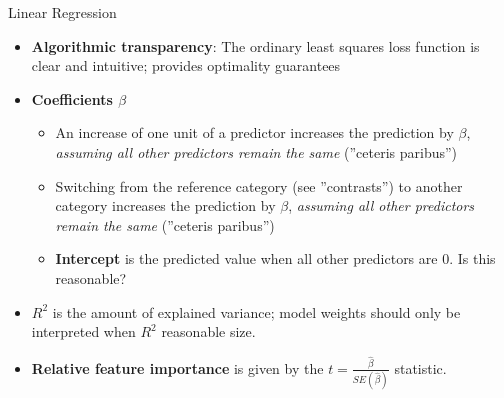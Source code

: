 \documentclass[ignorenonframetext,xcolor=x11names]{beamer}
\begin{document}
\begin{frame}{Linear Regression}
\begin{itemize}
   \item \textbf{Algorithmic transparency}: The ordinary least squares loss function is clear and intuitive; provides optimality guarantees
   \item \textbf{Coefficients $\beta$}
   \begin{itemize}
      \item An increase of one unit of a predictor increases the prediction by $\beta$, \emph{assuming all other predictors remain the same} (''ceteris paribus'')
      \item Switching from the reference category (see ''contrasts'') to another category increases the prediction by $\beta$, \emph{assuming all other predictors remain the same} (''ceteris paribus'')
      \item \textbf{Intercept} is the predicted value when all other predictors are 0. Is this reasonable?
   \end{itemize}
   \item $R^2$ is the amount of explained variance; model weights should only be interpreted when $R^2$ reasonable size.
   \item \textbf{Relative feature importance} is given by the $t=\frac{\hat{\beta}}{SE(\hat{\beta})}$ statistic.
\end{itemize}
\end{frame}


\end{document}
